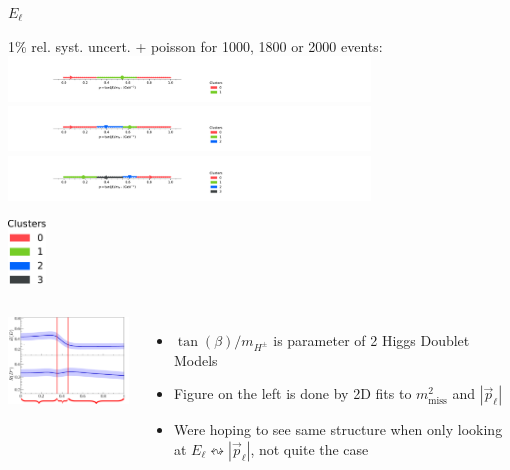 \begin{frame}{$E_\ell$}{\relax}
	\centering
	\begin{changemargin}{-1cm}{-1cm}
	{
		\begin{minipage}{10cm}
			{\small 1\% rel. syst. uncert. + poisson for 1000, 1800 or 2000 events:}
			\centering
			{\includegraphics[clip, trim=4.5cm 1cm 21cm 2.0cm, height=1.2cm]{figures/from-paper/El_tanbeta_err1}}
			{\includegraphics[clip, trim=4.5cm 1cm 21cm 2.0cm, height=1.2cm]{figures/from-paper/El_tanbeta_err2}}
			{\includegraphics[clip, trim=4.5cm 1cm 21cm 2.0cm, height=1.2cm]{figures/from-paper/El_tanbeta_err3}}
	\end{minipage}
	}
	\begin{minipage}{2cm}
		\vspace{2cm}
		\includegraphics[height=1.7cm]{figures/from-paper/el_err3_legend.pdf}
	\end{minipage}
	\end{changemargin}
	\begin{columns}
	\includegraphics[width=5cm]{figures/type2_2hdm_vs_rd_rds_1205_5442_results_only_cluster.pdf}
	\begin{itemize}
	\item $\tan(\beta)/m_{H^\pm}$ is parameter of 2 Higgs Doublet Models 
	\item Figure on the left is done by 2D fits to $m_\text{miss}^2$ and $|\vec p_\ell|$
	\item Were hoping to see same structure when only looking at $E_\ell \leftrightsquigarrow |\vec p_\ell|$, not quite the case
	\end{itemize}
	\end{columns}
\end{frame}
